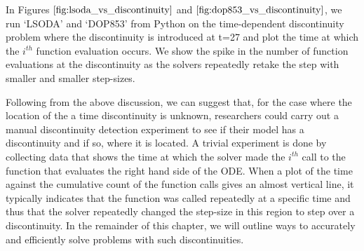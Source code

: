 In Figures $\ref{fig:lsoda_vs_discontinuity}$ and $\ref{fig:dop853_vs_discontinuity}$, we run `LSODA' and `DOP853' from Python on the time-dependent discontinuity problem where the discontinuity is introduced at t=27 and plot the time at which the $i^{th}$ function evaluation occurs. We show the spike in the number of function evaluations at the discontinuity as the solvers repeatedly retake the step with smaller and smaller step-sizes.

Following from the above discussion, we can suggest that, for the case where the location of the a time discontinuity is unknown, researchers could carry out a manual discontinuity detection experiment to see if their model has a discontinuity and if so, where it is located. A trivial experiment is done by collecting data that shows the time at which the solver made the $i^{th}$ call to the function that evaluates the right hand side of the ODE. When a plot of the time against the cumulative count of the function calls gives an almost vertical line, it typically indicates that the function was called repeatedly at a specific time and thus that the solver repeatedly changed the step-size in this region to step over a discontinuity. In the remainder of this chapter, we will outline ways to accurately and efficiently solve problems with such discontinuities.
